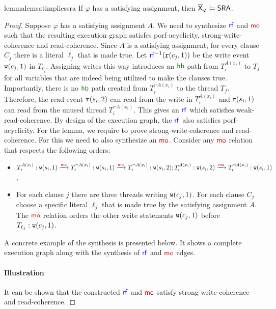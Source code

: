 \begin{restatable}{lemma}{lemsatimpliessra}
    \label{lem:sat-implies-sra}
If $\varphi$ has a satisfying assignment, then $\overline{\mathsf{\color{black}X}}_\varphi \models \mathsf{SRA}$. 
\end{restatable}
\begin{proof}
Suppose $\varphi$ has a satisfying assignment $A$. We need to synthesize $\rf$ and $\mo$ such that the resulting execution graph satisfes porf-acyclicity, strong-write-coherence and read-coherence. Since $A$ is a satisfying assignment, for every clause $C_j$ there is a literal $\ell_j$ that is made true. Let $\rf^{-1}(\rd(c_j, 1))$ be the write event $\mathtt{w}(c_j, 1)$ in $T_{\ell_j}$. Assigning writes this way introduces an $\hb$ path from $T_i^{A(x_i)}$ to $T_f$ for all variables that are indeed being utilized to make the clauses true. Importantly, there is no $\hb$ path created from $T_{i}^{\neg A(x_i)}$ to the thread $T_f$. Therefore, the read event $\mathtt{r}(s_i, 2)$ can read from the write in $T_i^{A(x_i)}$ and $\mathtt{r}(s_i, 1)$ can read from the unused thread $T_i^{\neg A(x_i)}$. This gives an $\rf$ which satisfies weak-read-coherence. By design of the execution graph, the $\rf$ also satisfies porf-acyclicity. For the lemma, we require to prove strong-write-coherence and read-coherence. For this we need to also synthesize an $\mo$. 
Consider any  $\mo$ relation that respects the following orders:
    \begin{itemize}[leftmargin=0.1em]
    \item $T_{i}^{A(x_i)}: \wt(s_i, 1) \xra{\mo} T_i^{\neg A(x_i)}: \wt(s_i, 1) \xra{\mo}T_{i}^{\neg A(x_i)}: \wt(s_i, 2);  T_i^{A(x_i)}: \wt(s_i, 2) \xra{\mo} T_i^{\neg A(x_i)}: \wt(s_i, 1)$,
    \item For each clause $j$ there are three threads writing $\mathtt{w}(c_j, 1)$.  For each clause $C_j$ choose a specific literal $\ell_j$ that is made true by the satisfying assignment $A$. The $\mo$ relation orders the other write statements $\mathtt{w}(c_j, 1)$ before $T_{\ell_j}: \mathtt{w}(c_j, 1)$. 
    \end{itemize} 
A concrete example of the synthesis is presented below. It shows a complete execution graph along with the synthesis of $\rf$ and $\mo$ edges.
\paragraph*{Illustration}\label{app:hardness-example}


It can be shown that the constructed $\rf$ and $\mo$ satisfy strong-write-coherence and read-coherence.


\end{proof}
